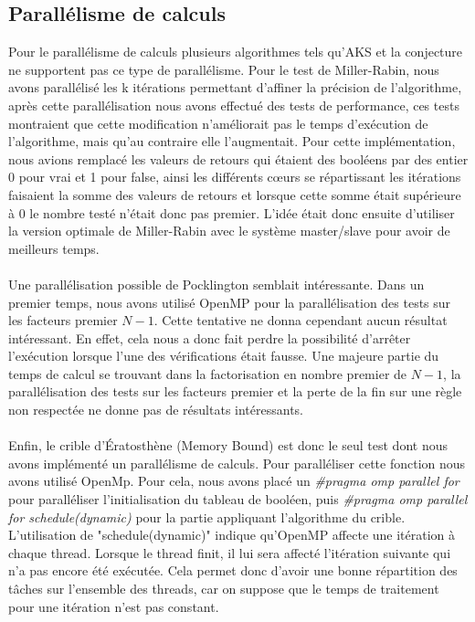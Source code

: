 		\subsection{Parallélisme de calculs}		
	Pour le parallélisme de calculs plusieurs algorithmes tels qu'AKS et la conjecture ne supportent pas ce type de parallélisme. Pour le test de Miller-Rabin, nous avons parallélisé les k itérations permettant d'affiner la précision de l'algorithme, après cette parallélisation nous avons effectué des tests de performance, ces tests montraient que cette modification n'améliorait pas le temps d'exécution de l'algorithme, mais qu'au contraire elle l'augmentait. Pour cette implémentation, nous avions remplacé les valeurs de retours qui étaient des booléens par des entier 0 pour vrai et 1 pour false, ainsi les différents cœurs se répartissant les itérations faisaient la somme des valeurs de retours et lorsque cette somme était supérieure à 0 le nombre testé n'était donc pas premier. L'idée était donc ensuite d'utiliser la version optimale de Miller-Rabin avec le système master/slave pour avoir de meilleurs temps.
	
	\paragraph{}Une parallélisation possible de Pocklington semblait intéressante. Dans un premier temps, nous avons utilisé OpenMP pour la parallélisation des tests sur les facteurs premier $N-1$. Cette tentative ne donna cependant aucun résultat intéressant. En effet, cela nous a donc fait perdre la possibilité d'arrêter l'exécution lorsque l'une des vérifications était fausse. Une majeure partie du temps de calcul se trouvant dans la factorisation en nombre premier de $N-1$, la parallélisation des tests sur les facteurs premier et la perte de la fin sur une règle non respectée ne donne pas de résultats intéressants. 
	
	\paragraph{}Enfin, le crible d’Ératosthène (Memory Bound) est donc le seul test dont nous avons implémenté un parallélisme de calculs. Pour paralléliser cette fonction nous avons utilisé OpenMp. Pour cela, nous avons placé un \textit{\#pragma omp parallel for} pour paralléliser l'initialisation du tableau de booléen, puis
\textit{\#pragma omp parallel for schedule(dynamic)}	pour la partie appliquant l'algorithme du crible. L'utilisation de "schedule(dynamic)" indique qu'OpenMP affecte une itération à chaque thread. Lorsque le thread finit, il lui sera affecté l’itération suivante qui n’a pas encore été exécutée. Cela permet donc d'avoir une bonne répartition des tâches sur l'ensemble des threads, car on suppose que le temps de traitement pour une itération n'est pas constant.
	
